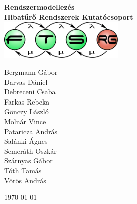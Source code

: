 \begin{titlepage}
\begin{center}
\vspace*{5cm}

{\huge \bfseries Rendszermodellezés}\\[0.8cm]

{\Large \bfseries Hibatűrő Rendszerek Kutatócsoport}\\[0.8cm]

\includegraphics[width=60mm,keepaspectratio]{figures/ftsrg-logo}\\

\vfill

Bergmann Gábor \\
Darvas Dániel \\
Debreceni Csaba \\
Farkas Rebeka \\
Gönczy László \\
Molnár Vince \\
Pataricza András \\
Salánki Ágnes \\
Semeráth Oszkár \\
Szárnyas Gábor \\
Tóth Tamás \\
Vörös András

\vfill

{\large \today}

\vspace{3cm}
\end{center}
\end{titlepage}
